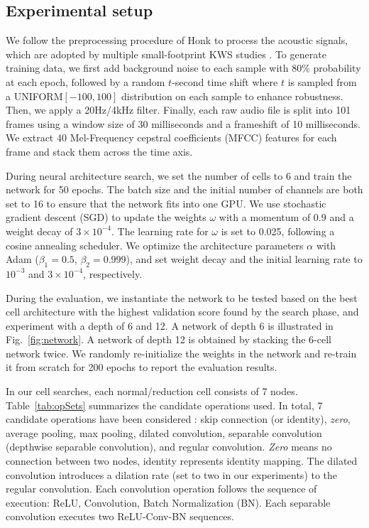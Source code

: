 \documentclass[a4paper]{article}
\begin{document}
 
\subsection{Experimental setup}



We follow the preprocessing procedure of Honk \cite{tang2017honk} to process the acoustic signals, which are adopted by multiple small-footprint KWS studies \cite{tang2017honk,tang2018deep,sainath2015convolutional,choi2019temporal,chen2019small}. To generate training data, we first add background noise to each sample with 80\% probability at each epoch, followed by a random $t$-second time shift where $t$ is sampled from a UNIFORM$[-100, 100]$ distribution on each sample to enhance robustness. Then, we apply a 20Hz/4kHz filter. 
Finally, each raw audio file is split into 101 frames using a window size of 30 milliseconds and a frameshift of 10 milliseconds. We extract 40 Mel-Frequency cepstral coefficients (MFCC) features for each frame and stack them across the time axis.


During neural architecture search, we set the number of cells to 6 and train the network for 50 epochs.
The batch size and the initial number of channels are both set to 16 to ensure that the network fits into one GPU. 
We use stochastic gradient descent (SGD) to update the weights $\omega$ with a momentum of 0.9 and a weight decay of $3 \times 10^{-4}$. The learning rate for $\omega$ is set to 0.025, following a cosine annealing scheduler.
We optimize the architecture parameters $\alpha$ with Adam ($\beta_1=0.5$, $\beta_2=0.999$), and set weight decay and the initial learning rate to  $10^{-3}$ and $3 \times 10^{-4}$, respectively.

During the evaluation, we instantiate the network to be tested based on the best cell architecture with the highest validation score found by the search phase, and experiment with a depth of 6 and 12. A network of depth 6 is illustrated in Fig.~\ref{fig:network}. A network of depth 12 is obtained by stacking the 6-cell network twice. 
We randomly re-initialize the weights in the network and re-train it from scratch for 200 epochs to report the evaluation results.





In our cell searches, each normal/reduction cell consists of 7 nodes.
Table~\ref{tab:opSets} summarizes the candidate operations used.
In total, 7 candidate operations have been considered : skip connection (or identity), \textit{zero}, average pooling, max pooling, dilated convolution,  separable convolution (depthwise separable convolution), and regular convolution. \textit{Zero} means no connection between two nodes, identity represents identity mapping. 
The dilated convolution introduces a dilation rate (set to two in our experiments) to the regular convolution.
Each convolution operation follows the sequence of execution: ReLU, Convolution, Batch Normalization (BN). Each separable convolution executes two ReLU-Conv-BN sequences.
\end{document}
